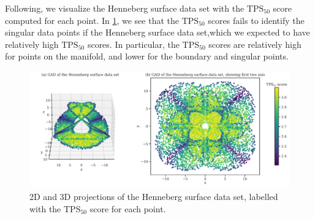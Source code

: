 Following, we visualize the Henneberg surface data set with the $\text{TPS}_{50}$ score computed for each point. In \cref{fig:gad-henneberg-3d-tps-50}, we see that the $\text{TPS}_{50}$ scores fails to identify the singular data points if the Henneberg surface data set,which we expected to have relatively high $\text{TPS}_{50}$ scores. In particular, the $\text{TPS}_{50}$ scores are relatively high for points on the manifold, and lower for the boundary and singular points.
\begin{figure}[H]
    \centering
    \includegraphics[width=\textwidth]{thesis/figures/gad-henneberg-3d-tps-50.pdf}
    \caption{2D and 3D projections of the Henneberg surface data set, labelled with the $\text{TPS}_{50}$ score for each point.}
    \label{fig:gad-henneberg-3d-tps-50}
\end{figure}

